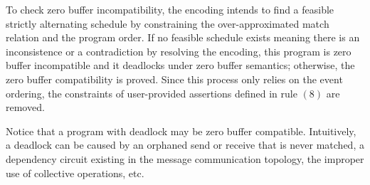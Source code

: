 \encodingzb


To check zero buffer incompatibility, the encoding intends to find a feasible strictly alternating schedule by constraining the over-approximated match relation and the program order. If no feasible schedule exists meaning there is an inconsistence or a contradiction by resolving the encoding, this program is zero buffer incompatible and it deadlocks under zero buffer semantics; otherwise, the zero buffer compatibility is proved. Since this process only relies on the event ordering, the constraints of user-provided assertions defined in rule $(8)$ are removed. 


Notice that a program with deadlock may be zero buffer compatible. Intuitively, a deadlock can be caused by an orphaned send or receive that is never matched, a dependency circuit existing in the message communication topology, the improper use of collective operations, etc. 


